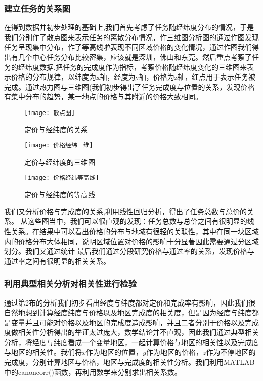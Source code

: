 \documentclass{ctexart}
\begin{document}
\subsubsection{建立任务的关系图}
在得到数据并初步处理的基础上,我们首先考虑了任务随经纬度分布的情况，于是我们分别作了散点图来表示任务的离散分布情况，作三维图分析图的通过作图发现任务呈现集中分布，作了等高线啦表现不同区域价格的变化情况，通过作图我们得出有几个中心任务分布比较密集，应该就是深圳，佛山和东莞。然后重点考察了任务的经纬度数据,把任务的完成度作为指标，考察价格随经纬度变化的三维图来表示价格的分布规律，以纬度为x轴，经度为y轴，价格为z轴，红点用于表示任务被完成。通过热力图与三维图(我们初步得出了任务完成度与位置的关系，发现价格有集中分布的趋势，某一地点的价格与其附近的价格大致相同。
\begin{figure}[htbp] 
\centering
\texttt{[image: 散点图]} 
\caption{定价与经纬度的关系}
\end{figure}
\begin{figure}[htbp] 
\centering
\texttt{[image: 价格经纬三维]} 
\caption{定价与经纬度的三维图}
\end{figure}
\begin{figure}[htbp] 
\centering
\texttt{[image: 价格经纬等高线]} 
\caption{定价与经纬度的等高线}
\end{figure}

我们又分析价格与完成度的关系,利用线性回归分析，得出了任务总数与总价的关系。
从这些图当中，我们可以很直观的发现：任务总数与总价之间有很明显的线性关系。在结果中可以看出价格的分布与地域有很轻的关联性，其中在同一块区域内的价格分布大体相同，说明区域位置对价格的影响十分显著因此需要通过分区域划分。我们又通过统计
最后我们通过分段研究价格与通过率的关系，发现价格与通过率之间有很明显的相关关系。

\subsubsection{利用典型相关分析对相关性进行检验}
通过第2布的分析我们初步看出经度与纬度都对定价和完成率有影响，因此我们很自然地想到计算经度纬度与价格以及地区完成度的相关度，但是因为经度与纬度都是变量并且可能对价格以及地区的完成度造成影响，并且二者分别于价格以及完成度做相关性分析得出的举证太过庞大，数学结论并不直观，因此我们通过典型相关分析，将经度与纬度看成一个变量地区，一起计算价格与地区的相关性以及完成度与地区的相关性。我们将$x$作为地区的位置，$y$作为地区的价格，$z$作为不停地区的完成度，分别计算地区与价格，地区与完成度的相关性分析。我们利用MATLAB中的canoncorr()函数，再利用数学来分别求出相关系数。
\end{document}
